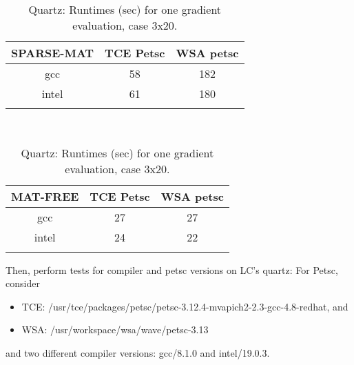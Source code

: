 \documentclass[letterpaper]{article}
\begin{document}
\begin{table}[h]
  \begin{tabular}{c|cc}
    \hline\noalign{\smallskip} 
   SPARSE-MAT &  TCE Petsc & WSA petsc    \\ 
    \hline\noalign{\smallskip} 
      gcc  &   58       &     182        \\
      intel&   61       &     180 \\
      \noalign{\smallskip}\hline
  \end{tabular}\\[2ex]
  \begin{tabular}{c|cc}
    \hline\noalign{\smallskip}
    MAT-FREE &  TCE Petsc & WSA petsc    \\ 
    \hline\noalign{\smallskip} 
      gcc  &   27       &     27         \\
      intel&   24       &     22 \\
    \noalign{\smallskip}\hline
  \end{tabular}
  \caption{Quartz: Runtimes (sec) for one gradient evaluation, case 3x20.}
  \label{tab:compiler_quartz} 
\end{table}

Then, perform tests for compiler and petsc versions on LC's quartz: For Petsc,
consider
\begin{itemize}
  \item TCE: /usr/tce/packages/petsc/petsc-3.12.4-mvapich2-2.3-gcc-4.8-redhat,
    and
  \item WSA: /usr/workspace/wsa/wave/petsc-3.13
\end{itemize}
and two different compiler versions: gcc/8.1.0 and intel/19.0.3.
\end{document}
